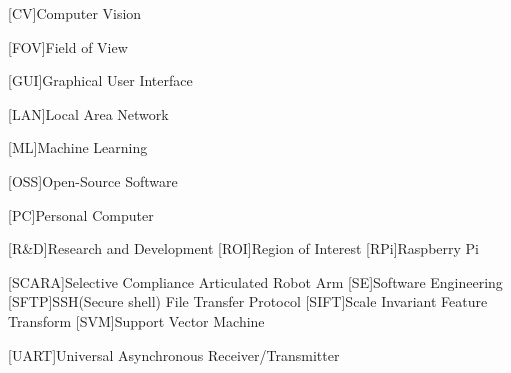 \begin{acronym}
	[CV]{Computer Vision}
	
	[FOV]{Field of View}
	
	[GUI]{Graphical User Interface}
	
	[LAN]{Local Area Network}
	
	[ML]{Machine Learning}
	
	[OSS]{Open-Source Software}
	
	[PC]{Personal Computer}
	
	[R\&D]{Research and Development}
	[ROI]{Region of Interest}
	[RPi]{Raspberry Pi}
			
	[SCARA]{Selective Compliance Articulated Robot Arm}
	[SE]{Software Engineering}
	[SFTP]{SSH(Secure shell) File Transfer Protocol}
	[SIFT]{Scale Invariant Feature Transform}
	[SVM]{Support Vector Machine}
	
	[UART]{Universal Asynchronous Receiver/Transmitter}
\end{acronym}

